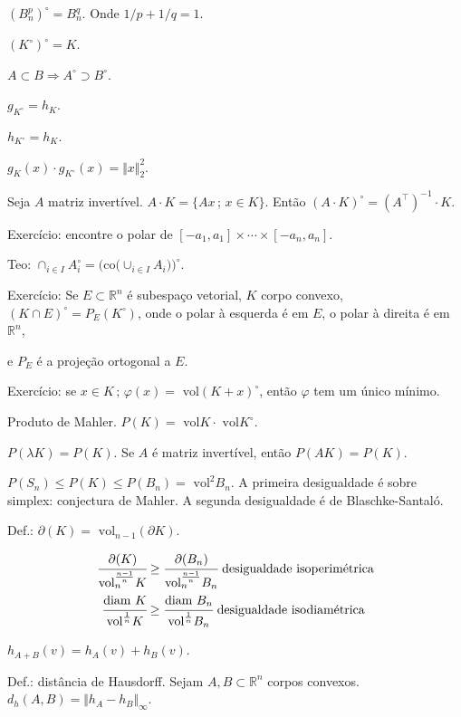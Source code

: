 \documentclass[12pt]{article}
\begin{document}
$(B_n^p)^\circ = B_n^q$. Onde $1/p + 1/q = 1$.

$(K^\circ)^\circ = K$.

$A \subset B \Rightarrow A^\circ \supset B^\circ$.

$g_{K^\circ} = h_K$.

$h_{K^\circ} = h_K$.

$g_K(x) \cdot g_{K^\circ}(x) = \Vert x \Vert_2^2$.

Seja $A$ matriz invert\'ivel. $A\cdot K = \{ Ax \,;\, x \in K \}$. Ent\~ao $(A\cdot K)^\circ = (A^\top)^{-1}\cdot K$.

Exerc\'icio: encontre o polar de $[-a_1, a_1] \times \cdots \times [-a_n, a_n]$.

Teo: $\cap_{i\in I} A_i^\circ = \bigg( \text{co}\bigg( \cup_{i\in I} A_i \bigg) \bigg)^\circ$.

Exerc\'icio: Se $E \subset \mathbb{R}^n$ \'e subespa\c{c}o vetorial, $K$ corpo convexo, $(K \cap E)^\circ = P_E (K^\circ)$, onde o polar \`a esquerda \'e em $E$, o polar \`a direita \'e em $\mathbb{R}^n$,

e $P_E$ \'e a proje\c{c}\~ao ortogonal a $E$.

Exerc\'icio: se $x \in K\,;\,\varphi(x) = \text{ vol} (K + x)^\circ$, ent\~ao $\varphi$ tem um \'unico m\'inimo.

Produto de Mahler. $P(K) = \text{ vol} K \cdot \text{ vol} K^\circ$.

$P(\lambda K) = P(K)$. Se $A$ \'e matriz invert\'ivel, ent\~ao $P(AK) = P(K)$.

$P(S_n) \le P(K) \le P(B_n) = \text{ vol}^2 B_n$. A primeira desigualdade \'e sobre simplex: conjectura de Mahler. A segunda desigualdade \'e de Blaschke-Santal\'o.

Def.: $\partial(K) = \text{ vol}_{n - 1}(\partial K)$.

\begin{align}
\cfrac{\partial(K)}{\text{vol}_n^{\frac{n-1}{n}} K} &\ge \cfrac{\partial(B_n)}{\text{vol}_n^{\frac{n-1}{n}} B_n}\text{  desigualdade isoperim\'etrica} \\
\cfrac{\text{diam }K}{\text{vol}^{\frac{1}{n}} K} &\ge \cfrac{\text{diam }B_n}{\text{vol}^{\frac{1}{n}} B_n}\text{  desigualdade isodiam\'etrica}
\end{align}

$h_{A + B}(v) = h_A(v) + h_B(v)$.

\vspace{100mm}

Def.: dist\^ancia de Hausdorff. Sejam $A, B \subset \mathbb{R}^n$ corpos convexos. $d_h(A, B) = \Vert h_A - h_B \Vert_\infty$.
\end{document}
